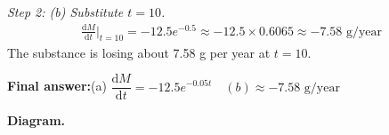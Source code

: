 \documentclass[11pt]{article}
\begin{document}
\textit{Step 2: (b) Substitute \( t = 10 \).}
\[\begin{gathered}
\frac{\mathrm{d}M}{\mathrm{d}t}\bigg|_{t=10} = -12.5e^{-0.5} \approx -12.5 \times 0.6065 \approx -7.58 \text{ g/year}
\end{gathered}\]
The substance is losing about 7.58 g per year at \( t = 10 \).

\begin{answerbox}
\textbf{Final answer:}\quad (a) \(\displaystyle  \dfrac{\mathrm{d}M}{\mathrm{d}t} = -12.5e^{-0.05t} \)\(\displaystyle  \quad  (b) \approx -7.58 \text{ g/year}\)
\end{answerbox}
\textbf{Diagram.}

\begin{center}
\end{center}
\end{document}
